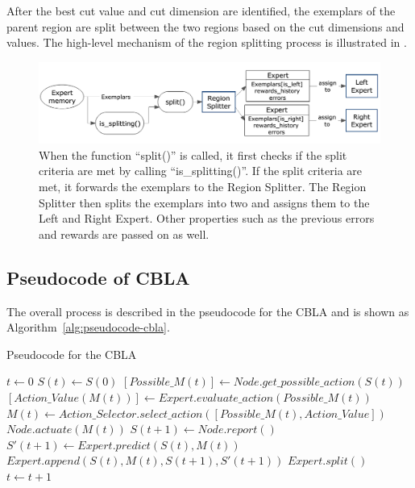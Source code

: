 After the best cut value and cut dimension are identified, the exemplars of the parent region are split between the two regions based on the cut dimensions and values. The high-level mechanism of the region splitting process is illustrated in .

\begin{figure}[!htb]
	\centering
	\includegraphics[width=1.0 \textwidth]{"fig/cbla/Block Diagram RegionSplitter"}
	\caption[Block diagram of the Region Splitter]{When the function “split()” is called, it first checks if the split criteria are met by calling ``is\_splitting()''. If the split criteria are met, it forwards the exemplars to the Region Splitter. The Region Splitter then splits the exemplars into two and assigns them to the Left and Right Expert. Other properties such as the previous errors and rewards are passed on as well. }
	\label{fig:Block Diagram RegionSplitter}
\end{figure}

\FloatBarrier
\subsection{Pseudocode of CBLA}
	
The overall process is described in the pseudocode for the CBLA and is shown as Algorithm~\ref{alg:pseudocode-cbla}.

\begin{algorithm}[!htb]
	\caption{Pseudocode for the CBLA} 
	\label{alg:pseudocode-cbla}
	\begin{algorithmic} [1]
		\State $t\gets 0$
		\State $S(t)\gets S(0)$
		\Loop
			\State $[Possible\_M(t)] \gets Node.get\_possible\_action(S(t)) $
			\State $[Action\_Value(M(t))] \gets Expert.evaluate\_action(Possible\_M(t))$
			\State $M(t) \gets Action\_Selector.select\_action([Possible\_M(t), Action\_Value]) $
			\State $Node.actuate(M(t)) $
			\State $S(t+1) \gets Node.report()$
			\State $S'(t+1) \gets Expert.predict(S(t), M(t))$
			\State $Expert.append(S(t), M(t), S(t+1), S'(t+1))$
			\State $Expert.split()$
			\State $t \gets t + 1 $
		\EndLoop
	\end{algorithmic}
\end{algorithm}


